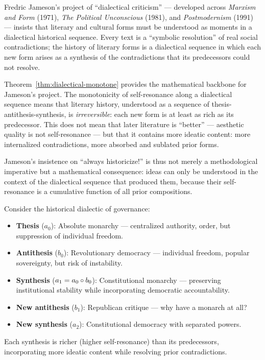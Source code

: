 \begin{interpretation}
\label{interp:ch16:jameson_dialectical_criticism}
Fredric Jameson's project of ``dialectical criticism'' --- developed across
\textit{Marxism and Form} (1971), \textit{The Political Unconscious} (1981),
and \textit{Postmodernism} (1991) --- insists that literary and cultural
forms must be understood as moments in a dialectical historical sequence.
Every text is a ``symbolic resolution'' of real social contradictions; the
history of literary forms is a dialectical sequence in which each new form
arises as a synthesis of the contradictions that its predecessors could
not resolve.

Theorem~\ref{thm:dialectical-monotone} provides the mathematical backbone
for Jameson's project.  The monotonicity of self-resonance along a
dialectical sequence means that literary history, understood as a sequence
of thesis-antithesis-synthesis, is \emph{irreversible}: each new form is at
least as rich as its predecessor.  This does not mean that later literature
is ``better'' --- aesthetic quality is not self-resonance --- but that it
contains more ideatic content: more internalized contradictions, more
absorbed and sublated prior forms.

Jameson's insistence on ``always historicize!'' is thus not merely a
methodological imperative but a mathematical consequence: ideas can only be
understood in the context of the dialectical sequence that produced them,
because their self-resonance is a cumulative function of all prior
compositions.
\end{interpretation}

\begin{example}
Consider the historical dialectic of governance:
\begin{itemize}
\item \textbf{Thesis} ($a_0$): Absolute monarchy --- centralized authority,
  order, but suppression of individual freedom.
\item \textbf{Antithesis} ($b_0$): Revolutionary democracy --- individual
  freedom, popular sovereignty, but risk of instability.
\item \textbf{Synthesis} ($a_1 = a_0 \circ b_0$): Constitutional monarchy
  --- preserving institutional stability while incorporating democratic
  accountability.
\item \textbf{New antithesis} ($b_1$): Republican critique --- why have a
  monarch at all?
\item \textbf{New synthesis} ($a_2$): Constitutional democracy with separated
  powers.
\end{itemize}
Each synthesis is richer (higher self-resonance) than its predecessors,
incorporating more ideatic content while resolving prior contradictions.
\end{example}

